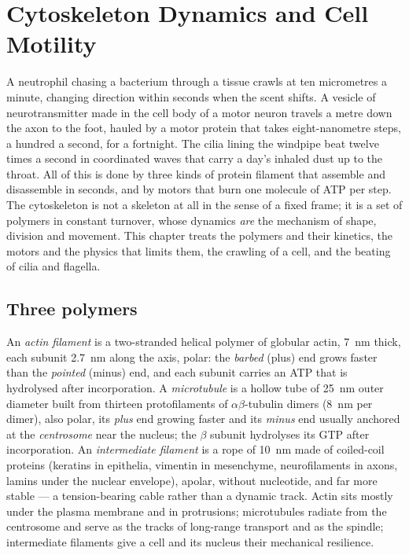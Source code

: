 \chapter{Cytoskeleton Dynamics and Cell Motility}\label{ch:b3:cytoskeleton-motility}

A neutrophil chasing a bacterium through a tissue crawls at ten
micrometres a minute, changing direction within seconds when the scent
shifts. A vesicle of neurotransmitter made in the cell body of a motor
neuron travels a metre down the axon to the foot, hauled by a motor
protein that takes eight-nanometre steps, a hundred a second, for a
fortnight. The cilia lining the windpipe beat twelve times a second in
coordinated waves that carry a day's inhaled dust up to the throat. All
of this is done by three kinds of protein filament that assemble and
disassemble in seconds, and by motors that burn one molecule of ATP per
step. The cytoskeleton is not a skeleton at all in the sense of a fixed
frame; it is a set of polymers in constant turnover, whose dynamics
\emph{are} the mechanism of shape, division and movement. This chapter
treats the polymers and their kinetics, the motors and the physics that
limits them, the crawling of a cell, and the beating of cilia and
flagella.

\section{Three polymers}

\begin{definition}\label{def:b3:cytoskeleton-motility:filaments}
An \emph{actin filament} is a two-stranded helical polymer of globular
actin, \qty{7}{nm} thick, each subunit \qty{2.7}{nm} along the axis,
polar: the \emph{barbed} (plus) end grows faster than the \emph{pointed}
(minus) end, and each subunit carries an ATP that is hydrolysed after
incorporation. A \emph{microtubule} is a hollow tube of \qty{25}{nm}
outer diameter built from thirteen protofilaments of $\alpha\beta$-tubulin
dimers (\qty{8}{nm} per dimer), also polar, its \emph{plus} end growing
faster and its \emph{minus} end usually anchored at the
\emph{centrosome} near the nucleus; the $\beta$ subunit hydrolyses its
GTP after incorporation. An \emph{intermediate filament} is a rope of
\qty{10}{nm} made of coiled-coil proteins (keratins in epithelia,
vimentin in mesenchyme, neurofilaments in axons, lamins under the
nuclear envelope), apolar, without nucleotide, and far more stable ---
a tension-bearing cable rather than a dynamic track. Actin sits mostly
under the plasma membrane and in protrusions; microtubules radiate from
the centrosome and serve as the tracks of long-range transport and as
the spindle; intermediate filaments give a cell and its nucleus their
mechanical resilience.
\end{definition}

